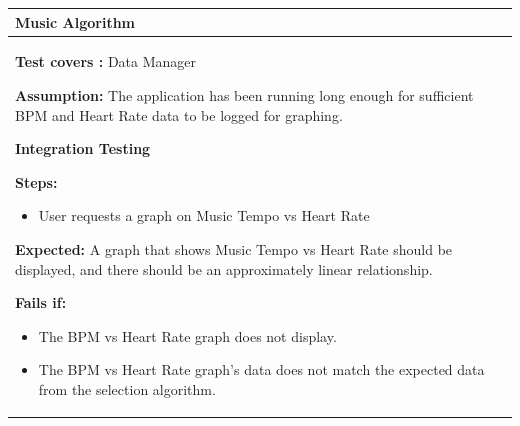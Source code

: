 \documentclass[letterpaper,english, 12pt]{scrreprt}
\begin{document}
\begin{center}
        \begin{tabular}{|C{15cm}|}
                \hline
                        \textbf{Music Algorithm}\\
                \hline
                        \begin{flushleft}
                                \textbf{Test covers : } Data Manager
                        \end{flushleft}
                        \begin{flushleft}
                                \textbf{Assumption: } The application has been running long enough for sufficient BPM and Heart Rate data to be logged for graphing.
                        \end{flushleft}
			\begin{center}
				\textbf{Integration Testing}
			\end{center}
                        \begin{flushleft}
                                \textbf{Steps: }
                        \end{flushleft}
				\begin{itemize}
					\item User requests a graph on Music Tempo vs Heart Rate
				\end{itemize}
			\begin{flushleft}
				\textbf{Expected: } A graph that shows Music Tempo vs Heart Rate should be displayed, and there should be an approximately linear relationship.
			\end{flushleft}
                        \begin{flushleft}
                                \textbf{Fails if: }
                        \end{flushleft}
                                \begin{itemize}
                                        \item The BPM vs Heart Rate graph does not display.
					\item The BPM vs Heart Rate graph's data does not match the expected data from the selection algorithm.
                                \end{itemize}
				\\
		\hline
        \end{tabular}
\end{center}
\end{document}
